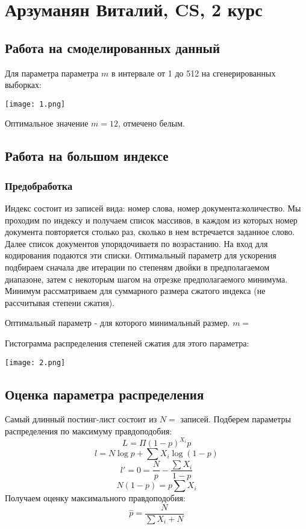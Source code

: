 \documentclass[12pt]{article}
\begin{document}
\section*{Арзуманян Виталий, CS, 2 курс}

\subsection*{Работа на смоделированных данный}
Для параметра параметра $m$ в интервале от 1 до 512 на сгенерированных выборках:

\texttt{[image: 1.png]}

Оптимальное значение $m=12$, отмечено белым.

\subsection*{Работа на большом индексе}

\subsubsection*{Предобработка}

Индекс состоит из записей вида: номер слова, номер документа:количество.
Мы проходим по индексу и получаем список массивов, в каждом из которых номер документа повторяется столько раз, сколько в нем встречается заданное слово. Далее список документов упорядочиваетя по возрастанию. На вход для кодирования подаются эти списки. Оптимальный параметр для ускорения подбираем сначала две итерации по степеням двойки в предполагаемом диапазоне, затем с некоторым шагом на отрезке предполагаемого минимума. Минимум рассматриваем для суммарного размера сжатого индекса (не рассчитывая степени сжатия).

Оптимальный параметр - для которого минимальный размер. $m = $

Гистограмма распределения степеней сжатия для этого параметра:

\texttt{[image: 2.png]}


\subsection*{Оценка параметра распределения}

Самый длинный постинг-лист состоит из $N=$ записей.
Подберем параметры распределения по максимуму правдоподобия:
$$L = \Pi (1-p)^{X_i}p$$
$$l = N\log p + \sum X_i\log(1-p)$$
$$l' = 0 = \frac{N}{p} - \frac{\sum X_i}{1-p}$$
$$N(1-p) = p\sum X_i$$
Получаем оценку максимального правдоподобия:
$$\widehat{p} = \frac{N}{\sum X_i + N}$$
\end{document}

